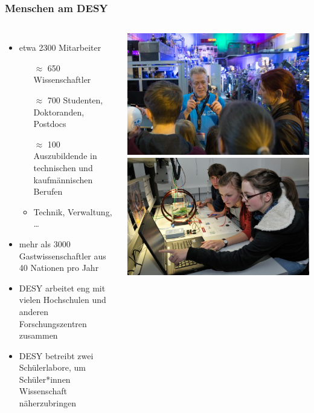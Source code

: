 \documentclass[10pt,t]{beamer}
\begin{document}
\begin{frame}
\frametitle{Menschen am DESY}
\vspace*{-2\baselineskip}
\begin{columns}[c]
\begin{itemize}
    \item etwa 2300 Mitarbeiter
    \begin{itemize}
        \item[$\approx\!$] 650 Wissenschaftler
        \item[$\approx\!$] 700 Studenten, Doktoranden, Postdocs
        \item[$\approx\!$] 100 Auszubildende in technischen und kaufmännischen Berufen
        \item Technik, Verwaltung, \dots
    \end{itemize}
    \item mehr als 3000 Gastwissenschaftler aus 40 Nationen pro Jahr
    \item DESY arbeitet eng mit vielen Hochschulen und anderen Forschungszentren zusammen
    \item DESY betreibt zwei Schülerlabore, um Schüler*innen Wissenschaft näherzubringen
\end{itemize}
    \includegraphics[width=\textwidth]{menschen3} \\[1ex]
    \includegraphics[width=\textwidth]{menschen1} \vspace*{-1cm}
\end{columns}
\end{frame}
\end{document}
